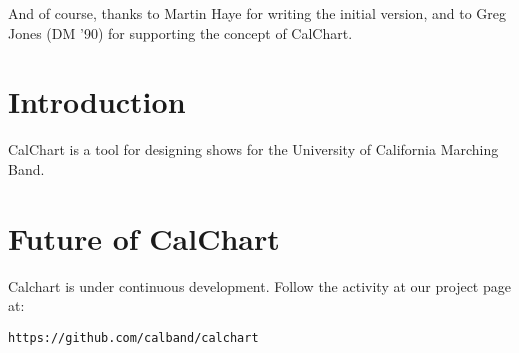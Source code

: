And of course, thanks to Martin Haye for writing the initial version,
and to Greg Jones (DM '90) for supporting the concept of CalChart.

\chapter{Introduction}

CalChart is a tool for designing shows for the University of California
Marching Band.







\chapter{Future of CalChart}\label{future}

Calchart is under continuous development.  Follow the activity at our
project page at:
\begin{verbatim}
https://github.com/calband/calchart
\end{verbatim}



